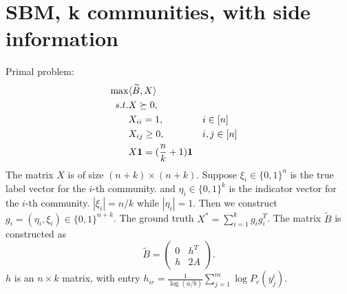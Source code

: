 \documentclass{ctexart}
\begin{document}
\section{SBM, k communities, with side information}
Primal problem:
\begin{align}
\max & \langle \widetilde{B},X \rangle \notag \\
s.t. & X \succeq 0, \notag\\
&X_{ii} = 1,  && i \in [n] \notag\\
&X_{ij} \geq 0, && i,j \in [n] \notag\\
&X \mathbf{1} = (\frac{n}{k}+1)\mathbf{1} \label{eq:AZ_ext}
\end{align}
The matrix $X$ is of size $(n+k) \times (n+k)$.
Suppose $\xi_i \in \{0,1\}^n $ is the true label vector for the $i$-th community.
and $\eta_i \in \{0,1\}^k$ is the indicator vector for the $i$-th community.
$|\xi_i|=n/k$ while $|\eta_i|=1$. Then we construct $g_i=(\eta_i, \xi_i)
\in \{0,1\}^{n+k}$.
The ground truth $X^*=\sum_{i=1}^k g_i g_i^T$.
The matrix $\widetilde{B}$ is constructed as
\begin{equation}\label{eq:B_lambda_def}
	\widetilde{B} = \begin{pmatrix} 0 & h^T  \\ h  & 2A \end{pmatrix}.
\end{equation}
$h$ is an $n\times k$ matrix, with entry $h_{ir} = \frac{1}{\log(a/b)}
\sum_{j=1}^m \log P_r(y^i_{j})$.


	
\end{document}
